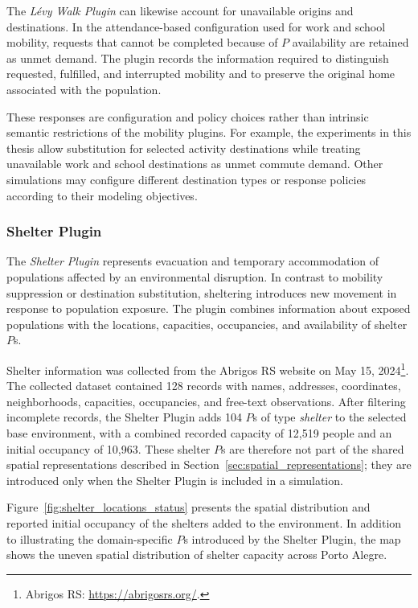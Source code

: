 The \textit{L\'evy Walk Plugin} can likewise account for unavailable origins and destinations. In the attendance-based configuration used for work and school mobility, requests that cannot be completed because of $P$ availability are retained as unmet demand.
The plugin records the information required to distinguish requested, fulfilled, and interrupted mobility and to preserve the original home associated with the population.

These responses are configuration and policy choices rather than intrinsic semantic restrictions of the mobility plugins. For example, the experiments in this thesis allow substitution for selected activity destinations while treating unavailable work and school destinations as unmet commute demand. Other simulations may configure different destination types or response policies according to their modeling objectives. %


\subsubsection{Shelter Plugin} \label{sec:shelter_plugin_inputs} 

The \textit{Shelter Plugin} represents evacuation and temporary accommodation of populations affected by an environmental disruption. In contrast to mobility suppression or destination substitution, sheltering introduces new movement in response to population exposure. The plugin combines information about exposed populations with the locations, capacities, occupancies, and availability of shelter $P$s. 

Shelter information was collected from the Abrigos RS website on May 15, 2024\footnote{Abrigos RS: \url{https://abrigosrs.org/}.}. The collected dataset contained 128 records with names, addresses, coordinates, neighborhoods, capacities, occupancies, and free-text observations. After filtering incomplete records, the Shelter Plugin adds 104 $P$s of type \textit{shelter} to the selected base environment, with a combined recorded capacity of 12,519 people and an initial occupancy of 10,963. These shelter $P$s are therefore not part of the shared spatial representations described in Section~\ref{sec:spatial_representations}; they are introduced only when the Shelter Plugin is included in a simulation.

Figure~\ref{fig:shelter_locations_status} presents the spatial distribution and reported initial occupancy of the shelters added to the environment. In addition to illustrating the domain-specific $P$s introduced by the Shelter Plugin, the map shows the uneven spatial distribution of shelter capacity across Porto Alegre.


